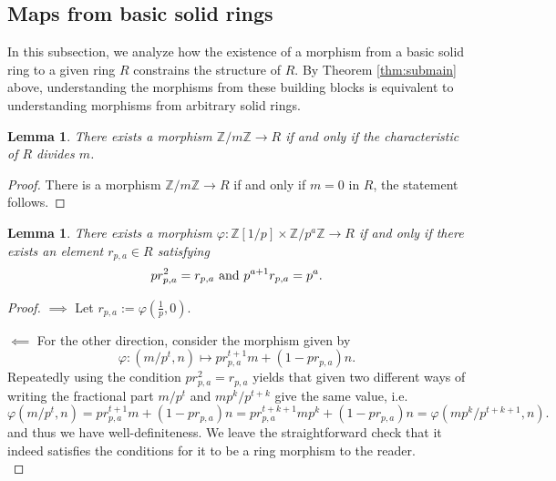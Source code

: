 \documentclass{amsart}
\newtheorem{theorem}[subsection]{Theorem}
\newtheorem{lemma}[subsection]{Lemma}
\newcommand{\Z}{{\mathbb Z}}
\begin{document}


    \subsection{Maps from basic solid rings}
    
    In this subsection, we analyze how the existence of a morphism from a basic solid ring to a given ring $R$ constrains the structure of $R$.  
    By Theorem \ref{thm:submain} above, understanding the morphisms from these building blocks is equivalent to understanding morphisms from arbitrary solid rings.

    \begin{lemma}
    \label{lm:explicit_meaning_fin}
        There exists a morphism $\Z/m\Z \to R$ if and only if the characteristic of $R$ divides $m$.
    \end{lemma}
    \begin{proof}
        There is a morphism $\Z/m\Z \to R$ if and only if $m = 0$ in $R$, the statement follows.
    \end{proof}

    \begin{lemma}
    \label{lm:explicit_meaning}
        There exists a morphism $\varphi: \Z[1/p] \times \Z/p^a\Z \to R$ if and only if there exists an element $r_{p,a} \in R$ satisfying
        $$
        pr_{p,a}^2 = r_{p,a} \textup{ and } p^{a+1}r_{p,a} = p^a.
        $$
    \end{lemma}
    \begin{proof}
        $\implies$
        Let $r_{p,a} := \varphi(\frac{1}{p},0)$.
        
        $\impliedby$
        For the other direction, consider the morphism given by
        $$
        \varphi:(m/p^t, n) \mapsto pr_{p,a}^{t+1}m + (1-pr_{p,a})n.
        $$ 
        Repeatedly using the condition $pr_{p,a}^2 = r_{p,a}$ yields that given two different ways of writing the fractional part $m/p^t$ and $mp^k/p^{t+k}$ give the same value, i.e.
        $$
        \varphi(m/p^t, n) = pr_{p,a}^{t+1}m + (1-pr_{p,a})n = pr_{p,a}^{t+k+1}mp^k + (1-pr_{p,a})n = \varphi(mp^k/p^{t+k+1},n).
        $$
        and thus we have well-definiteness.
        We leave the straightforward check that it indeed satisfies the conditions for it to be a ring morphism to the reader.\\
    \end{proof}
    
\end{document}
